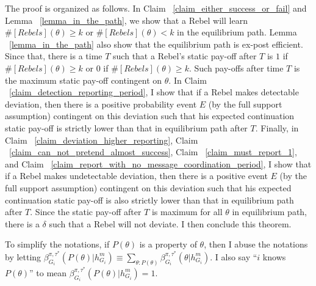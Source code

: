 \documentclass[12pt,letterpaper]{article}
\newtheorem*{main result}{Main Result}
\theoremstyle{definition}
\theoremstyle{remark}
\theoremstyle{claim}
\begin{document}
The proof is organized as follows. In Claim ~\ref{claim_either_success_or_fail} and Lemma ~\ref{lemma_in_the_path}, we show that a Rebel will learn $\#[Rebels](\theta)\geq k$ or $\#[Rebels](\theta)< k$ in the equilibrium path. Lemma ~\ref{lemma_in_the_path} also show that the equilibrium path is ex-post efficient. Since that, there is a time $T$ such that a Rebel's static pay-off after $T$ is $1$ if $\#[Rebels](\theta)\geq k$ or $0$ if $\#[Rebels](\theta)\geq k$. Such pay-offs after time $T$ is the maximum static pay-off contingent on $\theta$. In Claim ~\ref{claim_detection_reporting_period}, I show that if a Rebel makes detectable deviation, then there is a positive probability event $E$ (by the full support assumption) contingent on this deviation such that his expected continuation static pay-off is strictly lower than that in equilibrium path after $T$. Finally, in Claim ~\ref{claim_deviation_higher_reporting}, Claim ~\ref{claim_can_not_pretend_almost_success}, Claim ~\ref{claim_must_report_1}, and Claim ~\ref{claim_report_with_no_message_coordination_period}, I show that if a Rebel makes undetectable deviation, then there is a positive event $E$ (by the full support assumption) contingent on this deviation such that his expected continuation static pay-off is also strictly lower than that in equilibrium path after $T$. Since the static pay-off after $T$ is maximum for all $\theta$ in equilibrium path, there is a $\delta$ such that a Rebel will not deviate. I then conclude this theorem.

To simplify the notations, if $P(\theta)$ is a property of $\theta$, then I abuse the notations by letting $\beta^{\pi,\tau^*}_{G_i}(P(\theta)|h^{m}_{G_i})\equiv \sum_{\theta:P(\theta)}\beta^{\pi,\tau^*}_{G_i}(\theta|h^{m}_{G_i})$. I also say ``$i$ knows $P(\theta)$'' to mean $\beta^{\pi,\tau^*}_{G_i}(P(\theta)|h^{m}_{G_i})=1$. 
\end{document}
